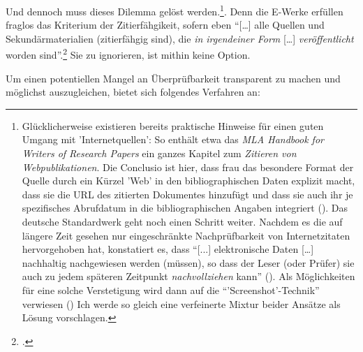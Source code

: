 Und dennoch muss dieses Dilemma gelöst werden.\footnote{Glücklicherweise existieren bereits praktische Hinweise für einen guten Umgang mit 'Internetquellen': So enthält etwa das \emph{MLA Handbook for Writers of Research Papers} ein ganzes Kapitel zum \emph{Zitieren von Webpublikationen}. Die Conclusio ist hier, dass frau das besondere Format der Quelle durch ein Kürzel 'Web' in den bibliographischen Daten explizit macht, dass sie die URL des
zitierten Dokumentes hinzufügt und dass sie auch ihr je spezifisches Abrufdatum
in die bibliographischen Angaben integriert (\cite[vgl.][S. 28ff u. 181ff]{ModLanAss2009a}). Das deutsche Standardwerk geht noch einen Schritt weiter. Nachdem es die auf längere Zeit gesehen nur eingeschränkte Nachprüfbarkeit von Internetzitaten hervorgehoben hat, konstatiert es, dass \enquote{[...] elektronische Daten [\ldots] nachhaltig nachgewiesen werden (müssen), so dass der Leser (oder Prüfer) sie auch zu jedem späteren Zeitpunkt \emph{nachvollziehen} kann} (\cite[vgl.][S. 86f]{Theisen2013a}). Als Möglichkeiten für eine solche Verstetigung wird dann auf die \enquote{'Screenshot'-Technik} verwiesen (\cite[vgl.][80 u. 87]{Theisen2013a}) Ich werde so gleich eine verfeinerte Mixtur beider Ansätze als Lösung vorschlagen.}. Denn die E-Werke erfüllen fraglos das Kriterium der Zitierfähgikeit, sofern eben \enquote{[\ldots] alle Quellen und Sekundärmaterialien (zitierfähgig sind), die \emph{in irgendeiner Form} [\ldots] \emph{veröffentlicht} worden sind}.\footcite[vgl.][S. 160 (herv. K.R)]{Theisen2013a} Sie zu ignorieren, ist mithin keine Option.

Um einen potentiellen Mangel an Überprüfbarkeit transparent zu machen und
möglichst auszugleichen, bietet sich folgendes Verfahren an:

